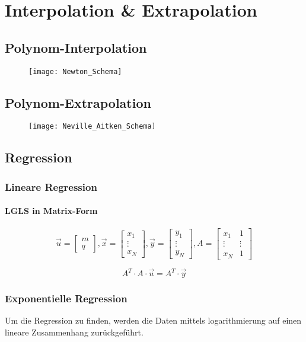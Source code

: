 \section{Interpolation \& Extrapolation}

\subsection{Polynom-Interpolation}

\begin{figure}[H]
    \texttt{[image: Newton\_Schema]}
\end{figure}

\subsection{Polynom-Extrapolation}

\begin{figure}[H]
    \texttt{[image: Neville\_Aitken\_Schema]}
\end{figure}

\subsection{Regression}

\subsubsection{Lineare Regression}

\paragraph{LGLS in Matrix-Form}

\begin{displaymath}
    \vec{u} = \begin{bmatrix} m \\ q \end{bmatrix},
    \vec{x} = \begin{bmatrix} x_1 \\ \vdots \\x_N \end{bmatrix},
    \vec{y} = \begin{bmatrix} y_1 \\ \vdots \\y_N \end{bmatrix},
    A = \begin{bmatrix} x_1 & 1 \\ \vdots & \vdots \\ x_N & 1 \end{bmatrix}
\end{displaymath}

\begin{displaymath}
    A^T \cdot A \cdot \vec{u} = A^T \cdot \vec{y}
\end{displaymath}

\subsubsection{Exponentielle Regression}

Um die Regression zu finden, werden die Daten mittels
logarithmierung auf einen lineare Zusammenhang zurückgeführt.